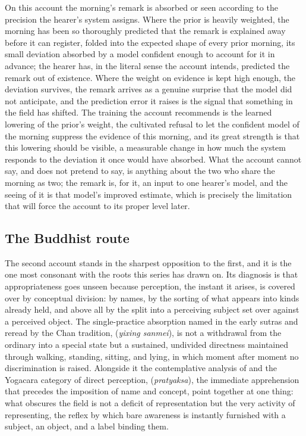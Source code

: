 On this account the morning's remark is absorbed or seen according to the precision the hearer's system assigns. Where the prior is heavily weighted, the morning has been so thoroughly predicted that the remark is explained away before it can register, folded into the expected shape of every prior morning, its small deviation absorbed by a model confident enough to account for it in advance; the hearer has, in the literal sense the account intends, predicted the remark out of existence. Where the weight on evidence is kept high enough, the deviation survives, the remark arrives as a genuine surprise that the model did not anticipate, and the prediction error it raises is the signal that something in the field has shifted. The training the account recommends is the learned lowering of the prior's weight, the cultivated refusal to let the confident model of the morning suppress the evidence of this morning, and its great strength is that this lowering should be visible, a measurable change in how much the system responds to the deviation it once would have absorbed. What the account cannot say, and does not pretend to say, is anything about the two who share the morning as two; the remark is, for it, an input to one hearer's model, and the seeing of it is that model's improved estimate, which is precisely the limitation that will force the account to its proper level later.

\subsection{The Buddhist route}
\label{p22:sub:perception-buddhist}

The second account stands in the sharpest opposition to the first, and it is the one most consonant with the roots this series has drawn on. Its diagnosis is that appropriateness goes unseen because perception, the instant it arises, is covered over by conceptual division: by names, by the sorting of what appears into kinds already held, and above all by the split into a perceiving subject set over against a perceived object. The single-practice absorption named in the early sutras and reread by the Chan tradition,  (\textit{yixing sanmei}), is not a withdrawal from the ordinary into a special state but a sustained, undivided directness maintained through walking, standing, sitting, and lying, in which moment after moment no discrimination is raised. Alongside it the contemplative analysis of  and the Yogacara category of direct perception,  (\textit{pratyaksa}), the immediate apprehension that precedes the imposition of name and concept, point together at one thing: what obscures the field is not a deficit of representation but the very activity of representing, the reflex by which bare awareness is instantly furnished with a subject, an object, and a label binding them.

